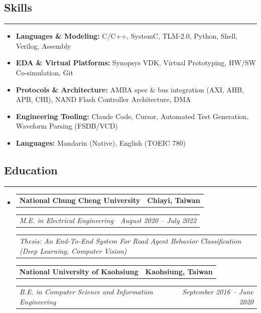 \documentclass[11pt,a4paper]{article}
\makeatletter
\newcommand{\headerrow}[2]
{\begin{tabular*}{\linewidth}{l@{\extracolsep{\fill}}r}
#1 &
#2 \\
\end{tabular*}}
\makeatother
\begin{document}
\subsection*{\large Skills}
\hrule
\vspace{0.3em}

\begin{itemize}[leftmargin=1em,noitemsep]
	\item \textbf{Languages \& Modeling:}
	      C/C++, SystemC, TLM-2.0, Python, Shell, Verilog, Assembly
	\item \textbf{EDA \& Virtual Platforms:}
	      Synopsys VDK, Virtual Prototyping, HW/SW Co-simulation, Git
	\item \textbf{Protocols \& Architecture:}
	      AMBA spec \& bus integration (AXI, AHB, APB, CHI), NAND Flash Controller Architecture, DMA
	\item \textbf{Engineering Tooling:}
	      Claude Code, Cursor, Automated Test Generation, Waveform Parsing (FSDB/VCD)
    \item \textbf{Languages:}
          Mandarin (Native), English (TOEIC 780)
\end{itemize}

\subsection*{\large Education}
\hrule
\vspace{0.3em}

\begin{itemize}[leftmargin=1em]
	\parskip=0.1em
		
	\item
	      \headerrow
	      {\textbf{National Chung Cheng University}}
	      {\textbf{Chiayi, Taiwan}}
	      \headerrow
	      {\emph{M.E. in Electrical Engineering}}
	      {\emph{August 2020 -- July 2022}}
          \headerrow
          {\emph{Thesis: An End-To-End System For Road Agent Behavior Classification (Deep Learning, Computer Vision)}}
          {\emph{}}
          
	      \headerrow
          {\textbf{National University of Kaohsiung}}
	      {\textbf{Kaohsiung, Taiwan}}
          \headerrow
	      {\emph{B.E. in Computer Science and Information Engineering}}
	      {\emph{September 2016 -- June 2020}}
\end{itemize}
\end{document}
